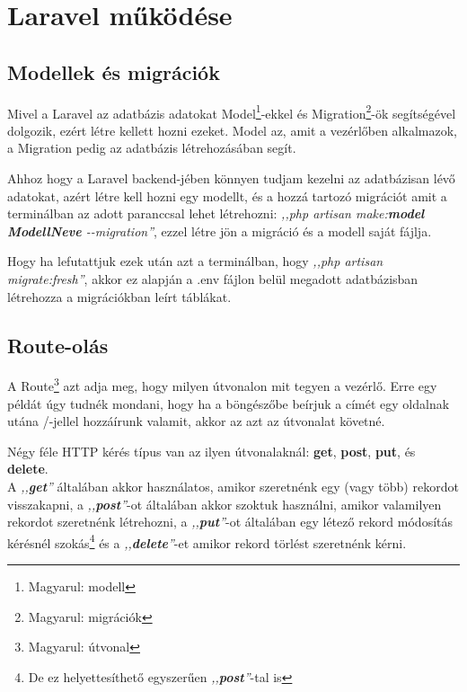 \documentclass[
]{thesis-ekf}
\theoremstyle{definition}
\theoremstyle{remark}
\begin{document}
	\section{Laravel működése}
	
	\subsection{Modellek és migrációk}
	Mivel a Laravel az adatbázis adatokat Model\footnote{Magyarul: modell}-ekkel és Migration\footnote{Magyarul: migrációk}-ök segítségével dolgozik, ezért létre kellett hozni ezeket. 
	Model az, amit a vezérlőben alkalmazok, a Migration pedig az adatbázis létrehozásában segít.\cite{laravel-model}
	
	Ahhoz hogy a Laravel backend-jében könnyen tudjam kezelni az adatbázisan lévő adatokat, azért létre kell hozni egy modellt, és a hozzá tartozó migrációt amit a terminálban az adott paranccsal lehet létrehozni: \emph{,,php artisan make:\textbf{model} \textbf{ModellNeve} \--\--migration''}, ezzel létre jön a migráció és a modell saját fájlja.
	
	
	Hogy ha lefutattjuk ezek után azt a terminálban, hogy \emph{,,php artisan migrate:fresh''}, akkor ez alapján a .env fájlon belül megadott adatbázisban létrehozza a migrációkban leírt táblákat.
	
	\subsection{Route-olás}
	A Route\footnote{Magyarul: útvonal} azt adja meg, hogy milyen útvonalon mit tegyen a vezérlő. Erre egy példát úgy tudnék mondani, hogy ha a böngészőbe beírjuk a címét egy oldalnak utána /-jellel hozzáírunk valamit, akkor az azt az útvonalat követné.
	
	Négy féle HTTP kérés típus van az ilyen útvonalaknál: \textbf{get}, \textbf{post}, \textbf{put}, és \textbf{delete}.\\
	A \emph{,,\textbf{get}''} általában akkor használatos, amikor szeretnénk egy (vagy több) rekordot visszakapni, a \emph{,,\textbf{post}''}-ot általában akkor szoktuk használni, amikor valamilyen rekordot szeretnénk létrehozni, a \emph{,,\textbf{put}''}-ot általában egy létező rekord módosítás kérésnél szokás\footnote{De ez helyettesíthető egyszerűen \emph{,,\textbf{post}''}-tal is} és a \emph{,,\textbf{delete}''}-et amikor rekord törlést szeretnénk kérni.
	
\end{document}
